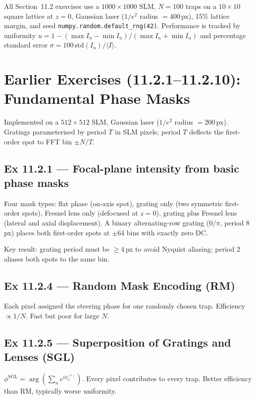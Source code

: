 \documentclass[11pt,a4paper]{article}
\begin{document}
All Section~11.2 exercises use a $1000\times1000$ SLM, $N=100$ traps on a
$10\times10$ square lattice at $z=0$, Gaussian laser ($1/e^2$ radius
$=400$\,px), 15\% lattice margin, and seed \texttt{numpy.random.default\_rng(42)}.
Performance is tracked by uniformity
$u = 1 - (\max I_n - \min I_n)/(\max I_n + \min I_n)$
and percentage standard error $\sigma = 100\,\mathrm{std}(I_n)/\langle I\rangle$.

\section{Earlier Exercises (11.2.1--11.2.10): Fundamental Phase Masks}

Implemented on a $512\times512$ SLM, Gaussian laser ($1/e^2$ radius
$=200$\,px). Gratings parameterised by period $T$ in SLM pixels;
period $T$ deflects the first-order spot to FFT bin $\pm N/T$.

\subsection{Ex 11.2.1 --- Focal-plane intensity from basic phase masks}

Four mask types: flat phase (on-axis spot), grating only (two symmetric
first-order spots), Fresnel lens only (defocused at $z=0$), grating plus
Fresnel lens (lateral and axial displacement). A binary alternating-row
grating ($0/\pi$, period 8\,px) places both first-order spots at $\pm64$ bins
with exactly zero DC.

Key result: grating period must be $\geq 4$\,px to avoid Nyquist aliasing;
period 2 aliases both spots to the same bin.

\subsection{Ex 11.2.4 --- Random Mask Encoding (RM)}

Each pixel assigned the steering phase for one randomly chosen trap.
Efficiency $\propto 1/N$. Fast but poor for large $N$.

\subsection{Ex 11.2.5 --- Superposition of Gratings and Lenses (SGL)}

$\phi^\text{SGL} = \arg(\sum_n e^{i\phi^{(s)}_n})$.
Every pixel contributes to every trap. Better efficiency than RM,
typically worse uniformity.
\end{document}
